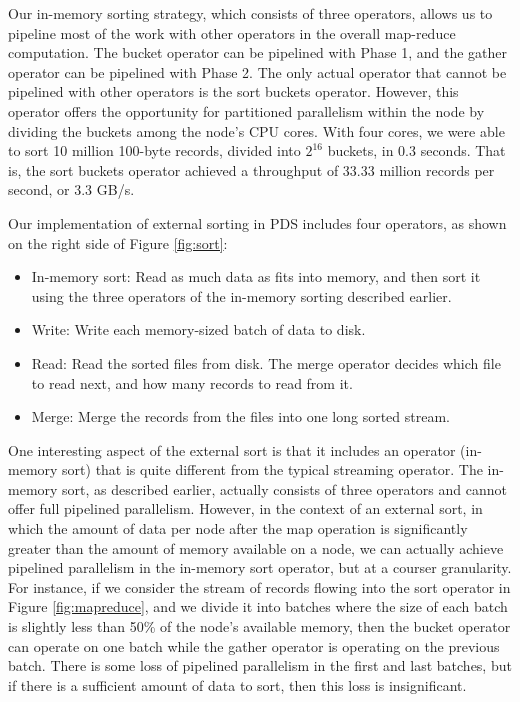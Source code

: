 \documentclass[ 11pt, letterpaper]{article}%
\begin{document}
Our in-memory sorting strategy, which consists of three operators, allows us to
pipeline most of the work with other operators in the overall map-reduce
computation. The bucket operator can be pipelined with Phase 1, and the gather
operator can be pipelined with Phase 2. The only actual operator that cannot be
pipelined with other operators is the sort buckets operator. However, this
operator offers the opportunity for partitioned parallelism within the node by
dividing the buckets among the node's CPU cores. With four cores, we were
able to sort 10 million 100-byte records, divided into $2^{16}$ buckets, in 0.3
seconds. That is, the sort buckets operator achieved a throughput of 33.33
million records per second, or 3.3 GB/s.

Our implementation of external sorting in PDS includes four operators, as
shown on the right side of Figure \ref{fig:sort}:
\begin{itemize}
  \item In-memory sort: Read as much data as fits into memory, and then
  sort it using the three operators of the in-memory sorting described earlier.
  \item Write: Write each memory-sized batch of data to disk.
  \item Read: Read the sorted files from disk. The merge operator decides which
  file to read next, and how many records to read from it.
  \item Merge: Merge the records from the files into one long sorted stream.
\end{itemize}

One interesting aspect of the external sort is that it includes an operator
(in-memory sort) that is quite different from the typical streaming
operator. The in-memory sort, as described earlier, actually consists of three
operators and cannot offer full pipelined parallelism. However, in the context
of an external sort, in which the amount of data per node after the map
operation is significantly greater than the amount of memory available on a
node, we can actually achieve pipelined parallelism in the in-memory sort
operator, but at a courser granularity. For instance, if we consider the
stream of records flowing into the sort operator in Figure \ref{fig:mapreduce},
and we divide it into batches where the size of each batch is slightly less
than 50\% of the node's available memory, then the bucket operator can operate
on one batch while the gather operator is operating on the previous batch.
There is some loss of pipelined parallelism in the first and last batches, but
if there is a sufficient amount of data to sort, then this loss is
insignificant.
\end{document}
